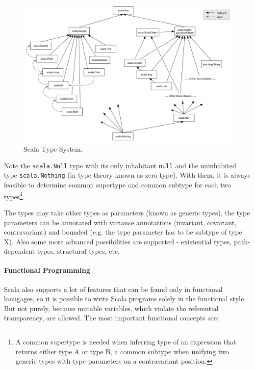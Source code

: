\documentclass[12pt,a4paper]{report}
\begin{document}
\begin{figure}[ht]
  \centering
	\includegraphics[width=\linewidth,height=\textheight,keepaspectratio]{img/ScalaTypeSystem.png}
	\caption{Scala Type System.}
	\label{ScalaTypeSystem}
\end{figure}

Note the \texttt{scala.Null} type with its only inhabitant \texttt{null} and the uninhabited type \texttt{scala.Nothing} (in type theory known as zero type). With them, it is always feasible to determine common supertype and common subtype for each two types\footnote{A common supertype is needed when inferring type of an expression that returns either type A or type B, a common subtype when unifying two generic types with type parameters on a contravariant position.}.

The types may take other types as parameters (known as generic types), the type parameters can be annotated with variance annotations (invariant, covariant, contravariant) and bounded (e.g. the type parameter has to be subtype of type X). Also some more advanced possibilities are supported - existential types, path-dependent types, structural types, etc\cite{ScalaAdvancedTypes}.

\paragraph{Functional Programming} Scala also supports a lot of features that can be found only in functional lanugages, so it is possible to write Scala programs solely in the functional style. But not purely, because mutable variables, which violate the referential transparency, are allowed. The most important functional concepts are:
\end{document}
